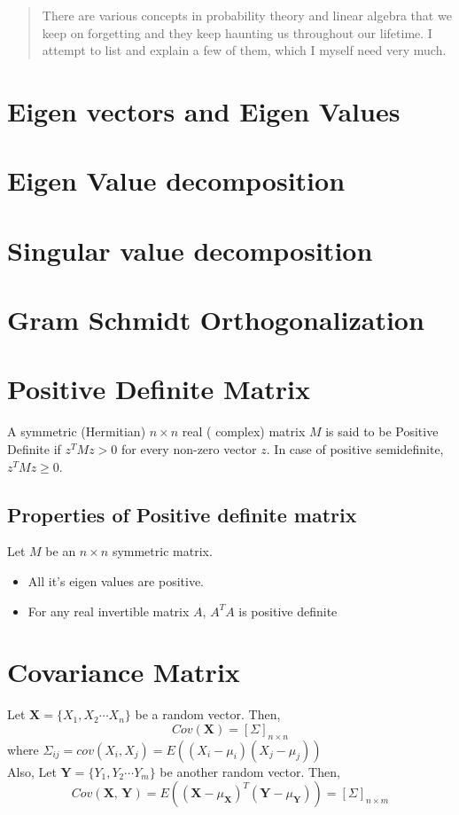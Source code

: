 \begin{abstract}
There are various concepts in probability theory and linear algebra that we keep on forgetting and they keep haunting us throughout our lifetime. I attempt to list and explain a few of them, which I myself need very much. 
\end{abstract}

\section{Eigen vectors and Eigen Values}
\section{Eigen Value decomposition}
\section{Singular value decomposition}
\section{Gram Schmidt Orthogonalization}
\section{Positive Definite Matrix}
	A symmetric (Hermitian) $n \times n$ real ( complex) matrix $M$ is said to be Positive Definite if $z^TMz > 0$ for every non-zero vector $z$. In case of positive semidefinite, $z^TMz \ge 0$. 
	
	\subsection{Properties of Positive definite matrix}
		Let $M$ be an $n \times n$ symmetric matrix.
		\begin{itemize}
			\item All it's eigen values are positive. 
			\item For any real invertible matrix $A$, $A^{T}A$ is positive definite
		\end{itemize}
\section{Covariance Matrix}
Let $\textbf{X} = \{X_1, X_2 \cdots X_n\}$ be a random vector. Then, 
\begin{equation}
Cov(\textbf{X}) = [\Sigma]_{n \times n} 
\end{equation}
where $\Sigma_{ij} = cov(X_i, X_j) = E((X_i - \mu_i)(X_j - \mu_j))$
\\
Also, Let $\textbf{Y} = \{Y_1, Y_2 \cdots Y_m\}$ be another random vector. Then, 
\begin{equation}
Cov(\textbf{X, Y}) = E({(\textbf{X} - \mu_\textbf{X})}^T(\textbf{Y} - \mu_\textbf{Y})) = [\Sigma]_{n \times m}
\end{equation}

